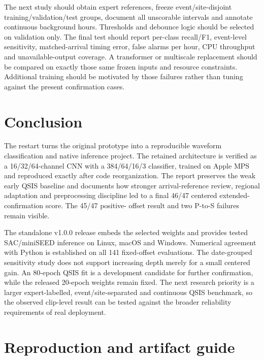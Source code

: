 \documentclass[a4paper,11pt,oneside]{article}
\begin{document}
The next study should obtain expert references, freeze event/site-disjoint
training/validation/test groups, document all unscorable intervals and
annotate continuous background hours. Thresholds and debounce logic should
be selected on validation only. The final test should report per-class
recall/F1, event-level sensitivity, matched-arrival timing error, false alarms
per hour, CPU throughput and unavailable-output coverage. A transformer or
multiscale replacement should be compared on exactly those same frozen
inputs and resource constraints. Additional training should be motivated by
those failures rather than tuning against the present confirmation cases.

\section{Conclusion}
The restart turns the original prototype into a reproducible waveform
classification and native inference project. The retained architecture is
verified as a 16/32/64-channel CNN with a 384/64/16/3 classifier, trained on
Apple MPS and reproduced exactly after code reorganization. The report
preserves the weak early QSIS baseline and documents how stronger
arrival-reference review, regional adaptation and preprocessing discipline
led to a final 46/47 centered extended-confirmation score. The 45/47 positive-
offset result and two P-to-S failures remain visible.

The standalone v1.0.0 release embeds the selected weights and provides tested
SAC/miniSEED inference on Linux, macOS and Windows. Numerical agreement with
Python is established on all 141 fixed-offset evaluations. The date-grouped sensitivity study does not support increasing depth merely
for a small centered gain. An 80-epoch QSIS fit is a development candidate
for further confirmation, while the released 20-epoch weights remain fixed.
The next research
priority is a larger expert-labelled, event/site-separated and continuous
QSIS benchmark, so the observed clip-level result can be tested against the
broader reliability requirements of real deployment.

\clearpage
\appendix
\section{Reproduction and artifact guide}\label{app:reproduce}
\end{document}
